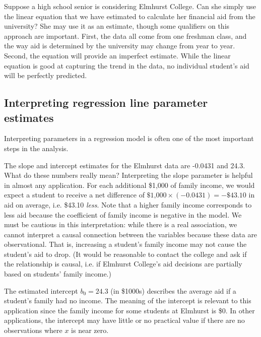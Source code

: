\begin{examplewrap}
\begin{nexample}{Suppose a high school senior is considering Elmhurst College. Can she simply use the linear equation that we have estimated to calculate her financial aid from the university?}
She may use it as an estimate, though some qualifiers on this approach are important. First, the data all come from one freshman class, and the way aid is determined by the university may change from year to year. Second, the equation will provide an imperfect estimate. While the linear equation is good at capturing the trend in the data, no individual student's aid will be perfectly predicted.
\end{nexample}
\end{examplewrap} 



\subsection{Interpreting regression line parameter estimates}


Interpreting parameters in a regression model is often one of the most important steps in the analysis.

\begin{examplewrap}
\begin{nexample}{The slope and intercept estimates for the Elmhurst data are -0.0431 and 24.3. What do these numbers really mean?}
Interpreting the slope parameter is helpful in almost any application. For each additional \$1,000 of family income, we would expect a student to receive a net difference of $\$\text{1,000}\times (-0.0431) = -\$43.10$ in aid on average, i.e. \$43.10 \emph{less}. Note that a higher family income corresponds to less aid because the coefficient of family income is negative in the model. We must be cautious in this interpretation: while there is a real association, we cannot interpret a causal connection between the variables because these data are observational. That is, increasing a student's family income may not cause the student's aid to drop. (It would be reasonable to contact the college and ask if the relationship is causal, i.e. if Elmhurst College's aid decisions are partially based on students' family income.)

The estimated intercept $b_0=24.3$ (in \$1000s) describes the average aid if a student's family had no income. The meaning of the intercept is relevant to this application since the family income for some students at Elmhurst is \$0. In other applications, the intercept may have little or no practical value if there are no observations where $x$ is near zero.
\end{nexample}
\end{examplewrap}

